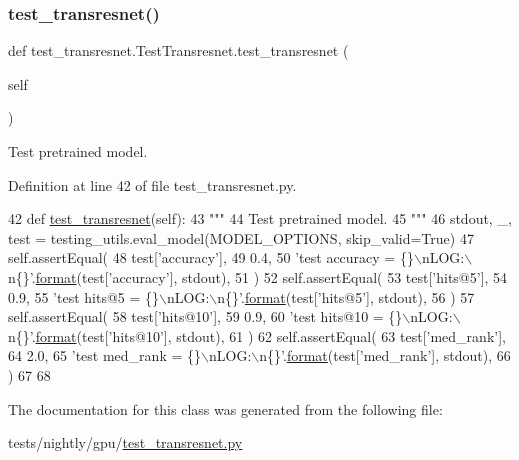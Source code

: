\subsubsection{\texorpdfstring{test\+\_\+transresnet()}{test\_transresnet()}}
{\footnotesize\ttfamily def test\+\_\+transresnet.\+Test\+Transresnet.\+test\+\_\+transresnet (\begin{DoxyParamCaption}\item[{}]{self }\end{DoxyParamCaption})}

\begin{DoxyVerb}Test pretrained model.
\end{DoxyVerb}
 

Definition at line 42 of file test\+\_\+transresnet.\+py.


\begin{DoxyCode}
42     \textcolor{keyword}{def }\hyperlink{namespacetest__transresnet}{test\_transresnet}(self):
43         \textcolor{stringliteral}{"""}
44 \textcolor{stringliteral}{        Test pretrained model.}
45 \textcolor{stringliteral}{        """}
46         stdout, \_, test = testing\_utils.eval\_model(MODEL\_OPTIONS, skip\_valid=\textcolor{keyword}{True})
47         self.assertEqual(
48             test[\textcolor{stringliteral}{'accuracy'}],
49             0.4,
50             \textcolor{stringliteral}{'test accuracy = \{\}\(\backslash\)nLOG:\(\backslash\)n\{\}'}.\hyperlink{namespaceparlai_1_1chat__service_1_1services_1_1messenger_1_1shared__utils_a32e2e2022b824fbaf80c747160b52a76}{format}(test[\textcolor{stringliteral}{'accuracy'}], stdout),
51         )
52         self.assertEqual(
53             test[\textcolor{stringliteral}{'hits@5'}],
54             0.9,
55             \textcolor{stringliteral}{'test hits@5 = \{\}\(\backslash\)nLOG:\(\backslash\)n\{\}'}.\hyperlink{namespaceparlai_1_1chat__service_1_1services_1_1messenger_1_1shared__utils_a32e2e2022b824fbaf80c747160b52a76}{format}(test[\textcolor{stringliteral}{'hits@5'}], stdout),
56         )
57         self.assertEqual(
58             test[\textcolor{stringliteral}{'hits@10'}],
59             0.9,
60             \textcolor{stringliteral}{'test hits@10 = \{\}\(\backslash\)nLOG:\(\backslash\)n\{\}'}.\hyperlink{namespaceparlai_1_1chat__service_1_1services_1_1messenger_1_1shared__utils_a32e2e2022b824fbaf80c747160b52a76}{format}(test[\textcolor{stringliteral}{'hits@10'}], stdout),
61         )
62         self.assertEqual(
63             test[\textcolor{stringliteral}{'med\_rank'}],
64             2.0,
65             \textcolor{stringliteral}{'test med\_rank = \{\}\(\backslash\)nLOG:\(\backslash\)n\{\}'}.\hyperlink{namespaceparlai_1_1chat__service_1_1services_1_1messenger_1_1shared__utils_a32e2e2022b824fbaf80c747160b52a76}{format}(test[\textcolor{stringliteral}{'med\_rank'}], stdout),
66         )
67 
68 
\end{DoxyCode}


The documentation for this class was generated from the following file\+:\begin{DoxyCompactItemize}
\item 
tests/nightly/gpu/\hyperlink{test__transresnet_8py}{test\+\_\+transresnet.\+py}\end{DoxyCompactItemize}
